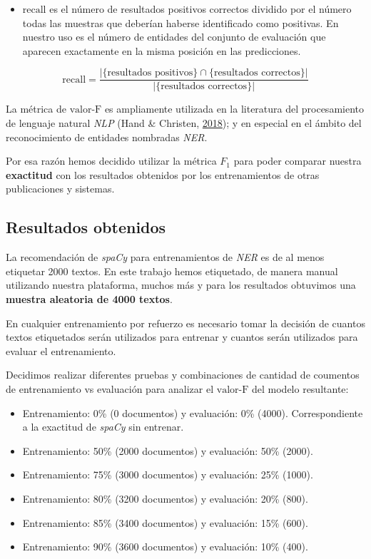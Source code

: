 \documentclass[12pt,a4paper,]{scrartcl}
\providecommand{\tightlist}{%
  \setlength{\itemsep}{0pt}\setlength{\parskip}{0pt}}
\begin{document}
\begin{itemize}
\tightlist
\item
  \(\text{recall}\) es el número de resultados positivos correctos dividido por el número todas las muestras que deberían haberse identificado como positivas.
  En nuestro uso es el número de entidades del conjunto de evaluación que aparecen exactamente en la misma posición en las predicciones.
\end{itemize}

\[
\text{recall}=\frac{|\{\text{resultados positivos}\}\cap\{\text{resultados correctos}\}|}{|\{\text{resultados correctos}\}|}
\]

La métrica de \(\text{valor-F}\) es ampliamente utilizada en la literatura del procesamiento de lenguaje natural \emph{NLP} (Hand \& Christen, \protect\hyperlink{ref-pub_1084928040}{2018}); y en especial en el ámbito del reconocimiento de entidades nombradas \emph{NER}.

Por esa razón hemos decidido utilizar la métrica \(F_1\) para poder comparar nuestra \textbf{exactitud} con los resultados obtenidos por los entrenamientos de otras publicaciones y sistemas.

\hypertarget{resultados-obtenidos}{%
\subsection{Resultados obtenidos}\label{resultados-obtenidos}}

La recomendación de \emph{spaCy} para entrenamientos de \emph{NER} es de al menos etiquetar 2000 textos. En este trabajo hemos etiquetado, de manera manual utilizando nuestra plataforma, muchos más y para los resultados obtuvimos una \textbf{muestra aleatoria de 4000 textos}.

En cualquier entrenamiento por refuerzo es necesario tomar la decisión de cuantos textos etiquetados serán utilizados para entrenar y cuantos serán utilizados para evaluar el entrenamiento.

Decidimos realizar diferentes pruebas y combinaciones de cantidad de coumentos de entrenamiento vs evaluación para analizar el \(\text{valor-F}\) del modelo resultante:

\begin{itemize}
\tightlist
\item
  Entrenamiento: 0\% (0 documentos) y evaluación: 0\% (4000). Correspondiente a la exactitud de \emph{spaCy} sin entrenar.
\item
  Entrenamiento: 50\% (2000 documentos) y evaluación: 50\% (2000).
\item
  Entrenamiento: 75\% (3000 documentos) y evaluación: 25\% (1000).
\item
  Entrenamiento: 80\% (3200 documentos) y evaluación: 20\% (800).
\item
  Entrenamiento: 85\% (3400 documentos) y evaluación: 15\% (600).
\item
  Entrenamiento: 90\% (3600 documentos) y evaluación: 10\% (400).
\end{itemize}
\end{document}
